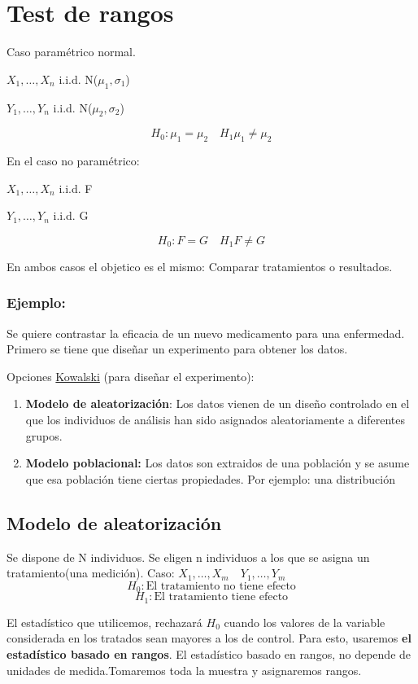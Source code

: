 \section{Test de rangos}

Caso paramétrico normal.

$X_1,\dots,X_n$ i.i.d. N($\mu_1,\sigma_1$)

$Y_1,\dots,Y_n$ i.i.d. N($\mu_2,\sigma_2$)

\[
H_0:\mu_1=\mu_2 \quad H_1 \mu_1 \neq \mu_2
\]

En el caso no paramétrico:

$X_1,\dots,X_n$ i.i.d. F

$Y_1,\dots,Y_n$ i.i.d. G

\[
H_0:F=G \quad H_1 F \neq G
\]

En ambos casos el objetico es el mismo: Comparar tratamientos o resultados.

\subsubsection*{Ejemplo:} 
Se quiere contrastar la eficacia de un nuevo medicamento para una enfermedad.
Primero se tiene que diseñar un experimento para obtener los datos.

Opciones \href{https://media.tenor.com/lsbTX_Avt2AAAAAM/brushing-teeth-kowalski.gif}{Kowalski} (para diseñar el experimento):
\begin{enumerate}
    \item \textbf{Modelo de aleatorización}: Los datos vienen de un diseño controlado en el que los 
    individuos de análisis han sido asignados aleatoriamente a diferentes grupos.
    \item \textbf{Modelo poblacional:} Los datos son extraidos de una población y se asume que esa población tiene ciertas propiedades. 
    Por ejemplo: una distribución
\end{enumerate}

\subsection{Modelo de aleatorización}

Se dispone de N individuos. Se eligen n individuos a los que se asigna un tratamiento(una medición).
Caso:
\(
X_1,\dots,X_m \quad Y_1,\dots,Y_m
\)
\[
H_0: \text{El tratamiento no tiene efecto} 
\]
\[
H_1: \text{El tratamiento tiene efecto} 
\]

El estadístico que utilicemos, rechazará $H_0$ cuando los valores de la variable considerada en los tratados sean mayores a los de control.
Para esto, usaremos \textbf{el estadístico basado en rangos}.
El estadístico basado en rangos, no depende de unidades de medida.Tomaremos toda la muestra y asignaremos rangos.

